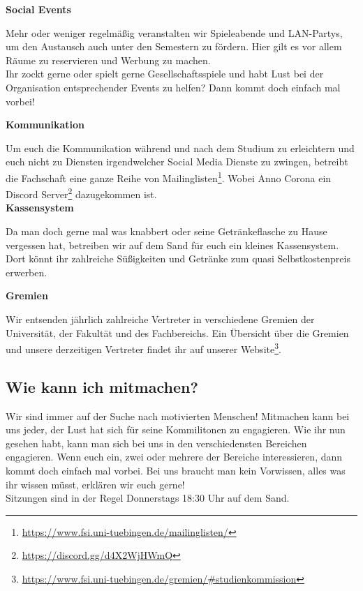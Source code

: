 \vfill \pagebreak
\textbf{Social Events}

Mehr oder weniger regelmäßig veranstalten wir Spieleabende und LAN-Partys, um
den Austausch auch unter den Semestern zu fördern. Hier gilt es vor allem Räume
zu reservieren und Werbung zu machen. \\
Ihr zockt gerne oder spielt gerne Gesellschaftsspiele und habt Lust bei der
Organisation entsprechender Events zu helfen? Dann kommt doch einfach mal
vorbei!

\textbf{Kommunikation}

Um euch die Kommunikation während und nach dem Studium zu erleichtern und euch
nicht zu Diensten irgendwelcher Social Media Dienste zu zwingen, betreibt die
Fachschaft eine ganze Reihe von
Mailinglisten\footnote{\url{https://www.fsi.uni-tuebingen.de/mailinglisten/}}.
Wobei Anno Corona ein Discord Server\footnote{\url{https://discord.gg/d4X2WjHWmQ}}
dazugekommen ist. \\

\textbf{Kassensystem}

Da man doch gerne mal was knabbert oder seine Getränkeflasche zu Hause
vergessen hat, betreiben wir auf dem Sand für euch ein kleines Kassensystem.
Dort könnt ihr zahlreiche Süßigkeiten und Getränke zum quasi Selbstkostenpreis
erwerben. 

\textbf{Gremien}

Wir entsenden jährlich zahlreiche Vertreter in verschiedene Gremien der
Universität, der Fakultät und des Fachbereichs. Ein Übersicht über die Gremien
und unsere derzeitigen Vertreter findet ihr auf unserer
Website\footnote{\url{https://www.fsi.uni-tuebingen.de/gremien/\#studienkommission}}.
\\

%
\subsection{Wie kann ich mitmachen?}
Wir sind immer auf der Suche nach motivierten Menschen! Mitmachen kann bei uns
jeder, der Lust hat sich für seine Kommilitonen zu engagieren. Wie ihr nun
gesehen habt, kann man sich bei uns in den verschiedensten Bereichen
engagieren. Wenn euch ein, zwei oder mehrere der Bereiche interessieren, dann
kommt doch einfach mal vorbei. Bei uns braucht man kein Vorwissen, alles was
ihr wissen müsst, erklären wir euch gerne!\\
Sitzungen sind in der Regel Donnerstags 18:30 Uhr auf dem Sand.

